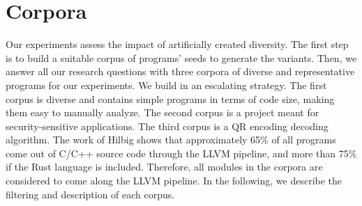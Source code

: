 

\section*{Corpora}
\label{section:crow:corpora}

Our experiments assess the impact of artificially created diversity. The first step is to build a suitable corpus of programs' seeds to generate the variants. Then, we answer all our research questions with three corpora of diverse and representative programs for our experiments. 
We build  in an escalating strategy. The first corpus is diverse and contains simple programs in terms of code size, making them easy to manually analyze. The second corpus is a project meant for security-sensitive applications. The third corpus is a QR encoding decoding algorithm. The work of Hilbig \etal \cite{Hilbig2021AnES} shows that approximately 65\% of all \wasm programs come out of C/C++ source code through the LLVM pipeline, and more than 75\% if the Rust language is included. Therefore, all modules in the corpora are considered to come along the LLVM pipeline. In the following, we describe the filtering and description of each corpus.

